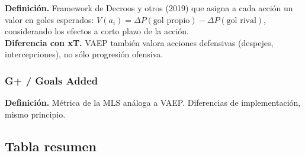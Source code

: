 \textbf{Definición.} Framework de Decroos y otros (2019) que asigna a cada acción un valor en goles esperados: $V(a_i) = \Delta P(\text{gol propio}) - \Delta P(\text{gol rival})$, considerando los efectos a corto plazo de la acción.\\
\textbf{Diferencia con xT.} VAEP también valora acciones defensivas (despejes, intercepciones), no sólo progresión ofensiva.

\subsubsection{G+ / Goals Added}

\textbf{Definición.} Métrica de la MLS análoga a VAEP. Diferencias de implementación, mismo principio.

\subsection{Tabla resumen}

